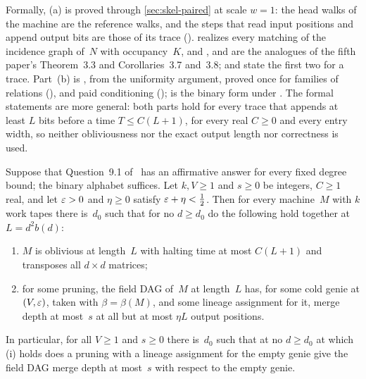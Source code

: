 \begin{outline}
Formally, (a) is proved through \cref{sec:skel-paired} at scale $w=1$: the head walks of the machine are the reference
walks, and the steps that read input positions and append output bits are those of its trace
().  realizes every matching of the incidence graph
of~$N$ with occupancy~$K$, and ,  and
 are the analogues of the fifth paper's Theorem~3.3 and Corollaries~3.7 and~3.8;
 and  state the first two for a
trace. Part~(b) is , from the uniformity argument, proved once for families of
relations (), and paid conditioning ();
 is the binary form under . The formal statements are more
general: both parts hold for every trace that appends at least $L$ bits before a time $T\le C(L+1)$, for every real
$C\ge0$ and every entry width, so neither obliviousness nor the exact output length nor correctness is used.
\end{outline}

\begin{corollary}\label{cor:HCstar}
Suppose that Question~9.1 of~\cite{DirectedRecovery2026} has an affirmative answer for every fixed degree bound; the
binary alphabet suffices. Let $k,V\ge1$ and $s\ge0$ be integers, $C\ge1$ real, and let $\varepsilon>0$ and $\eta\ge0$ satisfy
$\varepsilon+\eta<\frac12$. Then for every machine~$M$ with $k$ work tapes there is~$d_0$ such that for no $d\ge d_0$ do the
following hold together at $L=d^2b(d)$:
\begin{enumerate}[label=(\roman*)]
\item $M$ is oblivious at length~$L$ with halting time at most $C(L+1)$ and transposes all $d\times d$ matrices;
\item for some pruning, the field DAG of~$M$ at length~$L$ has, for some cold genie at $(V,\varepsilon)$, taken with
$\beta=\beta(M)$, and some lineage assignment for it, merge depth at most~$s$ at all but at most $\eta L$ output
positions.
\end{enumerate}
In particular, for all $V\ge1$ and $s\ge0$ there is~$d_0$ such that at no $d\ge d_0$ at which (i) holds does a pruning
with a lineage assignment for the empty genie give the field DAG merge depth at most~$s$ with respect to the empty genie.
\end{corollary}

